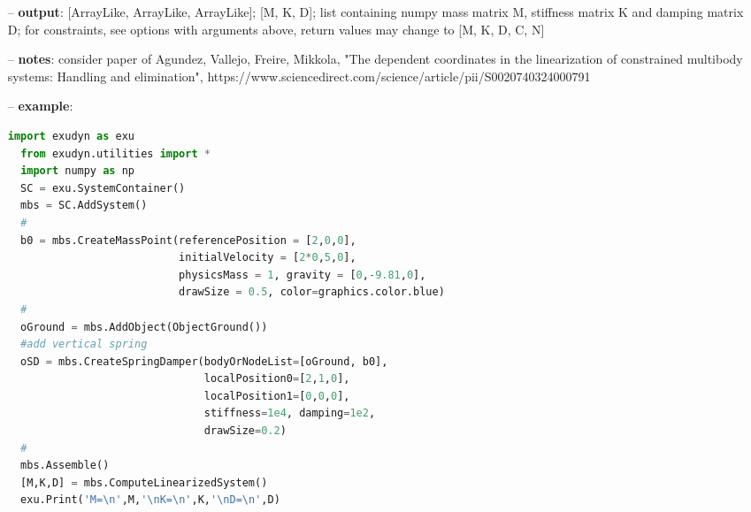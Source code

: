 \begin{itemize}[leftmargin=0.7cm]
\begin{itemize}[leftmargin=1.2cm]
\item[]{\it returnConstraintJacobian}: if True, the returned list contains [M, K, D, C, N] where C is the constraint jacobian and N is the nullspace matrix (may be empty)
\item[]{\it returnConstraintNullspace}: if True, the returned list contains [M, K, D, C, N] where C is the constraint jacobian (may be empty) and N is the nullspace matrix
\item[]{\it autoAssemble}: if True: if mbs.systemIsConsistent=False (system is not assembled), call mbs.Assemble() before solver calls
\end{itemize}
\item[--]
{\bf output}: [ArrayLike, ArrayLike, ArrayLike]; [M, K, D]; list containing numpy mass matrix M, stiffness matrix K and damping matrix D; for constraints, see options with arguments above, return values may change to [M, K, D, C, N]
\item[--]
{\bf notes}: consider paper of Agundez, Vallejo, Freire, Mikkola, "The dependent coordinates in the linearization of constrained multibody systems: Handling and elimination", https://www.sciencedirect.com/science/article/pii/S0020740324000791
\item[--]
{\bf example}: \vspace{-12pt}\ei\begin{lstlisting}[language=Python, xleftmargin=36pt]
  import exudyn as exu
  from exudyn.utilities import *
  import numpy as np
  SC = exu.SystemContainer()
  mbs = SC.AddSystem()
  #
  b0 = mbs.CreateMassPoint(referencePosition = [2,0,0],
                           initialVelocity = [2*0,5,0],
                           physicsMass = 1, gravity = [0,-9.81,0],
                           drawSize = 0.5, color=graphics.color.blue)
  #
  oGround = mbs.AddObject(ObjectGround())
  #add vertical spring
  oSD = mbs.CreateSpringDamper(bodyOrNodeList=[oGround, b0],
                               localPosition0=[2,1,0],
                               localPosition1=[0,0,0],
                               stiffness=1e4, damping=1e2,
                               drawSize=0.2)
  #
  mbs.Assemble()
  [M,K,D] = mbs.ComputeLinearizedSystem()
  exu.Print('M=\n',M,'\nK=\n',K,'\nD=\n',D)
\end{lstlisting}\vspace{-24pt}\bi\item[]\vspace{-24pt}\vspace{12pt}\end{itemize}
%

